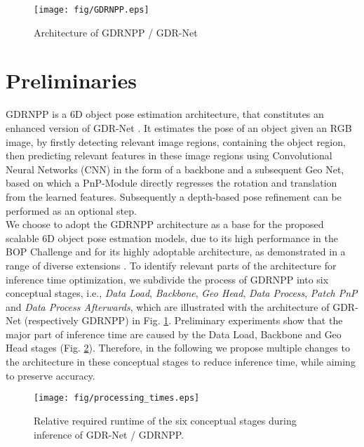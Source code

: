\begin{figure}[H]
    \centering
    \texttt{[image: fig/GDRNPP.eps]}
    \caption{Architecture of GDRNPP / GDR-Net \cite{wang2021gdr}}
    \label{fig:Architecture of GDRNPP}
\end{figure}

\section{Preliminaries}
\label{sec:preliminaries}
GDRNPP \cite{liuShanicelGdrnpp_bop20222024} is a 6D object pose estimation architecture, that constitutes an enhanced version of GDR-Net \cite{wang2021gdr}.
It estimates the pose of an object given an RGB image, by firstly detecting relevant image regions, containing the object region, then predicting relevant features in these image regions using Convolutional Neural Networks (CNN) in the form of a backbone and a subsequent Geo Net, based on which a PnP-Module directly regresses the rotation and translation from the learned features. Subsequently a depth-based pose refinement can be performed as an optional step.\\
%
We choose to adopt the GDRNPP architecture as a base for the proposed scalable 6D object pose estmation models, due to its high performance in the BOP Challenge \cite{BOPBenchmark6Da} and for its highly adoptable architecture, as demonstrated in a range of diverse extensions \cite{epro, stereo}.
To identify relevant parts of the architecture for inference time optimization, we subdivide the process of GDRNPP into six conceptual stages, i.e., \textit{Data Load}, \textit{Backbone}, \textit{Geo Head}, \textit{Data Process}, \textit{Patch PnP} and \textit{Data Process Afterwards}, which are illustrated with the architecture of GDR-Net (respectively GDRNPP) in Fig. \ref{fig:Architecture of GDRNPP}.
Preliminary experiments show that the major part of inference time are caused by the Data Load, Backbone and Geo Head stages (Fig. \ref{fig:runtimeportions}). Therefore, in the following we propose multiple changes to the architecture in these conceptual stages to reduce inference time, while aiming to preserve accuracy.

\begin{figure}[htbp]
    \centering
    \texttt{[image: fig/processing\_times.eps]}
    \caption{Relative required runtime of the six conceptual stages during inference of GDR-Net / GDRNPP.}
    \label{fig:runtimeportions}
\end{figure}